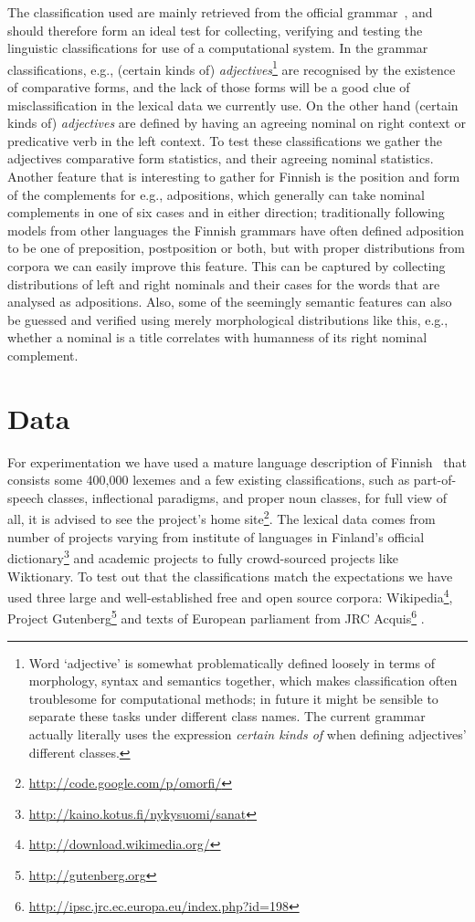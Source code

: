 \documentclass[a5paper]{article}
\begin{document}
The classification used
are mainly retrieved from the official grammar~\cite{visk}, and should
therefore form an ideal test for collecting, verifying and testing the
linguistic classifications for use of a computational system. In the grammar
classifications, e.g., (certain kinds of) \emph{adjectives}\footnote{Word
    `adjective' is somewhat problematically defined loosely in terms of
    morphology, syntax and semantics together, which makes classification often
    troublesome for computational methods; in future it might be sensible to
separate these tasks under different class names. The current grammar actually
literally uses the expression \emph{certain kinds of} when defining adjectives'
different classes.} are recognised by the existence of comparative forms, and
the lack of those forms will be a good clue of misclassification in the lexical
data we currently use. On the other hand (certain kinds of) \emph{adjectives}
are defined by having an agreeing nominal on right context or predicative verb
in the left context. To test these classifications we gather the adjectives
comparative form statistics, and their agreeing nominal statistics. Another
feature that is interesting to gather for Finnish is the position and form of
the complements for e.g., adpositions, which generally can take nominal
complements in one of six cases and in either direction; traditionally
following models from other languages the Finnish grammars have often defined
adposition to be one of preposition, postposition or both, but with proper
distributions from corpora we can easily improve this feature. This can be
captured by collecting distributions of left and right nominals and their cases
for the words that are analysed as adpositions. Also, some of the seemingly
semantic features can also be guessed and verified using merely morphological
distributions like this, e.g., whether a nominal is a title correlates with
humanness of its right nominal complement. 

\section{Data}

For experimentation we have used a mature language description of
Finn\-ish~\cite{pirinen2008suomen} that consists some 400,000 lexemes and a few
existing classifications, such as part-of-speech classes, inflectional
paradigms, and proper noun classes, for full view of all, it is advised to see
the project's home site\footnote{\url{http://code.google.com/p/omorfi/}}. The
lexical data comes from number of projects varying from institute of languages
in Finland's official
dictionary\footnote{\url{http://kaino.kotus.fi/nykysuomi/sanat}} and academic
projects to fully crowd-sourced projects like Wiktionary. To test out that the
classifications match the expectations we have used three large and
well-established free and open source corpora:
Wikipedia\footnote{\url{http://download.wikimedia.org/}}, Project
Gutenberg\footnote{\url{http://gutenberg.org}} and texts of European parliament
from JRC Acquis\footnote{\url{http://ipsc.jrc.ec.europa.eu/index.php?id=198}}
\cite{steinberger2006jrc}. 
\end{document}
